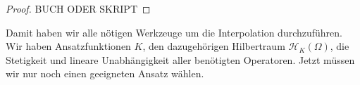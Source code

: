 \begin{proof}
BUCH ODER SKRIPT
\end{proof}


Damit haben wir alle nötigen Werkzeuge um die Interpolation durchzuführen. Wir haben Ansatzfunktionen $K$, den dazugehörigen Hilbertraum $\mathcal{H}_K(\Omega)$, die Stetigkeit und lineare Unabhängigkeit aller benötigten Operatoren. Jetzt müssen wir nur noch einen geeigneten Ansatz wählen.